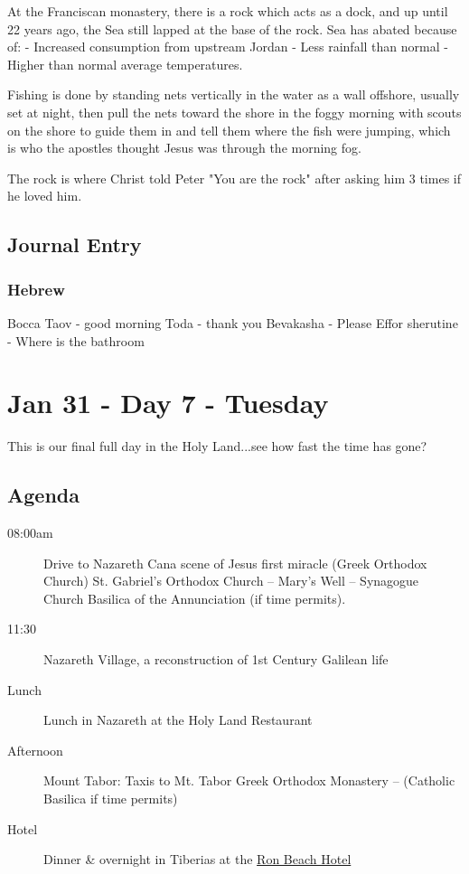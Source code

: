 \documentclass[letterpaper]{report}
\begin{document}
At the Franciscan monastery, there is a rock which acts as a dock, and up until 22 years ago, the Sea still lapped at the base of the rock.
Sea has abated because of:
- Increased consumption from upstream Jordan
- Less rainfall than normal
- Higher than normal average temperatures.

Fishing is done by standing nets vertically in the water as a wall offshore, usually set at night, then pull the nets toward the shore in the foggy morning with scouts on the shore to guide them in and tell them where the fish were jumping, which is who the apostles thought Jesus was through the morning fog.

The rock is where Christ told Peter "You are the rock" after asking him 3 times if he loved him.

\clearpage
\subsection{Journal Entry}
\subsubsection{Hebrew}
Bocca Taov - good morning
Toda - thank you
Bevakasha - Please
Effor sherutine - Where is the bathroom


\clearpage
\section{Jan 31 - Day 7 - Tuesday}
This is our final full day in the Holy Land...see how fast the time has gone?

\subsection{Agenda}
\begin{description}
	\item[08:00am] Drive to Nazareth Cana
	  \subitem scene of Jesus first miracle (Greek Orthodox Church)
	  \subitem St. Gabriel’s Orthodox Church – Mary’s Well – Synagogue Church 
	  \subitem Basilica of the Annunciation (if time permits).
	\item[11:30] Nazareth Village,
	    a reconstruction of 1st Century Galilean life
	\item[Lunch] Lunch in Nazareth at the Holy Land Restaurant
	\item[Afternoon] Mount Tabor: Taxis to Mt. Tabor 
	    \subitem Greek Orthodox Monastery – (Catholic Basilica if time permits)
	\item[Hotel] Dinner \& overnight in Tiberias at the   
	  \href{http://www.ronbeachhotel.com/}{Ron Beach Hotel}
\end{description}
\end{document}
